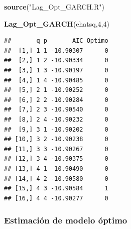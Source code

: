 \documentclass[
]{book}
\newenvironment{Shaded}{\begin{snugshade}}{\end{snugshade}}
\newcommand{\AttributeTok}[1]{\textcolor[rgb]{0.13,0.29,0.53}{#1}}
\newcommand{\DecValTok}[1]{\textcolor[rgb]{0.00,0.00,0.81}{#1}}
\newcommand{\FunctionTok}[1]{\textcolor[rgb]{0.13,0.29,0.53}{\textbf{#1}}}
\newcommand{\NormalTok}[1]{#1}
\newcommand{\OtherTok}[1]{\textcolor[rgb]{0.56,0.35,0.01}{#1}}
\newcommand{\SpecialCharTok}[1]{\textcolor[rgb]{0.81,0.36,0.00}{\textbf{#1}}}
\newcommand{\StringTok}[1]{\textcolor[rgb]{0.31,0.60,0.02}{#1}}
\begin{document}
\begin{Shaded}
\begin{Highlighting}[]
\FunctionTok{source}\NormalTok{(}\StringTok{"Lag\_Opt\_GARCH.R"}\NormalTok{)}

\FunctionTok{Lag\_Opt\_GARCH}\NormalTok{(ehatsq,}\DecValTok{4}\NormalTok{,}\DecValTok{4}\NormalTok{)}
\end{Highlighting}
\end{Shaded}

\begin{verbatim}
##       q p       AIC Optimo
##  [1,] 1 1 -10.90307      0
##  [2,] 1 2 -10.90334      0
##  [3,] 1 3 -10.90197      0
##  [4,] 1 4 -10.90485      0
##  [5,] 2 1 -10.90252      0
##  [6,] 2 2 -10.90284      0
##  [7,] 2 3 -10.90540      0
##  [8,] 2 4 -10.90232      0
##  [9,] 3 1 -10.90202      0
## [10,] 3 2 -10.90238      0
## [11,] 3 3 -10.90267      0
## [12,] 3 4 -10.90375      0
## [13,] 4 1 -10.90490      0
## [14,] 4 2 -10.90580      0
## [15,] 4 3 -10.90584      1
## [16,] 4 4 -10.90277      0
\end{verbatim}

\hypertarget{estimaciuxf3n-de-modelo-uxf3ptimo}{%
\subsubsection{Estimación de modelo óptimo}\label{estimaciuxf3n-de-modelo-uxf3ptimo}}

\begin{Shaded}
\end{Shaded}
\end{document}

